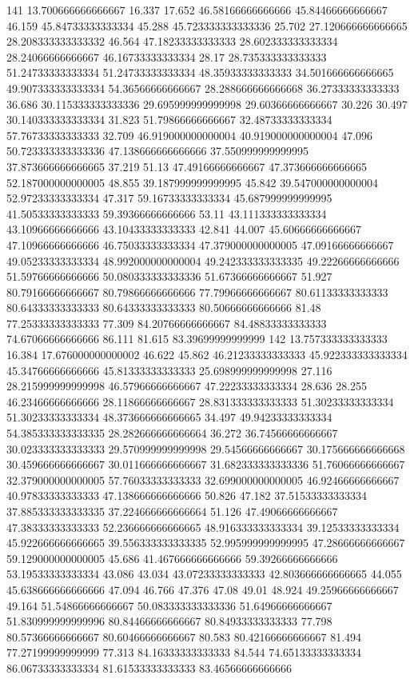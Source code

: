 141 13.700666666666667 16.337 17.652 46.58166666666666 45.84466666666667 46.159 45.84733333333334 45.288 45.723333333333336 25.702 27.120666666666665 28.208333333333332 46.564 47.18233333333333 28.602333333333334 28.24066666666667 46.16733333333334 28.17 28.735333333333333 51.24733333333334 51.24733333333334 48.35933333333333 34.501666666666665 49.907333333333334 54.36566666666667 28.288666666666668 36.27333333333333 36.686 30.115333333333336 29.695999999999998 29.60366666666667 30.226 30.497 30.140333333333334 31.823 51.79866666666667 32.48733333333334 57.76733333333333 32.709 46.919000000000004 40.919000000000004 47.096 50.723333333333336 47.138666666666666 37.550999999999995 37.873666666666665 37.219 51.13 47.49166666666667 47.373666666666665 52.187000000000005 48.855 39.187999999999995 45.842 39.547000000000004 52.97233333333334 47.317 59.16733333333334 45.687999999999995 41.50533333333333 59.39366666666666 53.11 43.111333333333334 43.10966666666666 43.10433333333333 42.841 44.007 45.60666666666667 47.10966666666666 46.75033333333334 47.379000000000005 47.09166666666667 49.05233333333334 48.992000000000004 49.242333333333335 49.22266666666666 51.59766666666666 50.080333333333336 51.67366666666667 51.927 80.79166666666667 80.79866666666666 77.79966666666667 80.61133333333333 80.64333333333333 80.64333333333333 80.50666666666666 81.48 77.25333333333333 77.309 84.20766666666667 84.48833333333333 74.67066666666666 86.111 81.615 83.39699999999999
142 13.757333333333333 16.384 17.676000000000002 46.622 45.862 46.21233333333333 45.922333333333334 45.34766666666666 45.81333333333333 25.698999999999998 27.116 28.215999999999998 46.57966666666667 47.22233333333334 28.636 28.255 46.23466666666666 28.11866666666667 28.831333333333333 51.30233333333334 51.30233333333334 48.373666666666665 34.497 49.94233333333334 54.385333333333335 28.282666666666664 36.272 36.74566666666667 30.023333333333333 29.570999999999998 29.54566666666667 30.175666666666668 30.459666666666667 30.011666666666667 31.682333333333336 51.76066666666667 32.379000000000005 57.76033333333333 32.699000000000005 46.92466666666667 40.97833333333333 47.138666666666666 50.826 47.182 37.51533333333334 37.885333333333335 37.224666666666664 51.126 47.49066666666667 47.38333333333333 52.236666666666665 48.916333333333334 39.12533333333334 45.922666666666665 39.556333333333335 52.995999999999995 47.28666666666667 59.129000000000005 45.686 41.467666666666666 59.39266666666666 53.19533333333334 43.086 43.034 43.07233333333333 42.803666666666665 44.055 45.638666666666666 47.094 46.766 47.376 47.08 49.01 48.924 49.25966666666667 49.164 51.54866666666667 50.083333333333336 51.64966666666667 51.830999999999996 80.84466666666667 80.84933333333333 77.798 80.57366666666667 80.60466666666667 80.583 80.42166666666667 81.494 77.27199999999999 77.313 84.16333333333333 84.544 74.65133333333334 86.06733333333334 81.61533333333333 83.46566666666666
